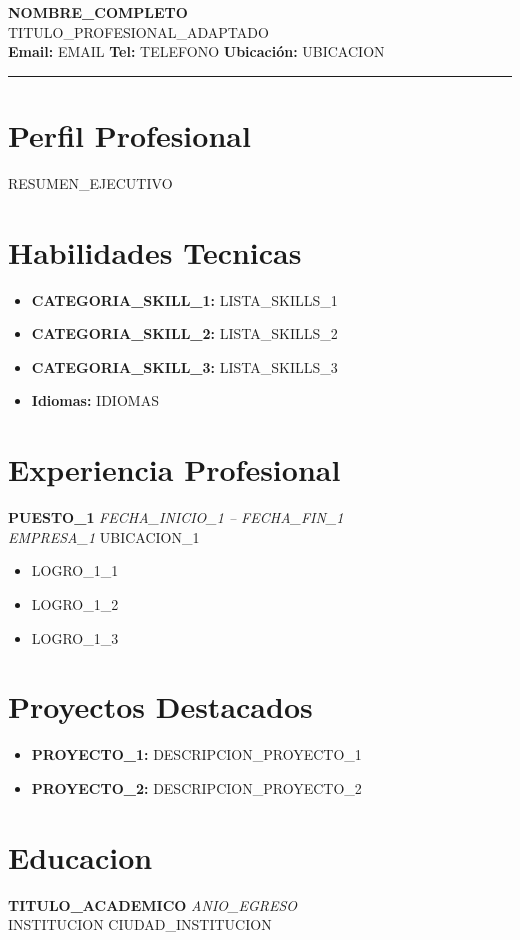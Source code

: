 \documentclass[11pt, a4paper]{article}
\begin{document}
{\LARGE\bfseries {{NOMBRE_COMPLETO}}}\\[2pt]
{\large {{TITULO_PROFESIONAL_ADAPTADO}}}\\[4pt]
\small
\textbf{Email:} {{EMAIL}} \quad
\textbf{Tel:} {{TELEFONO}} \quad
\textbf{Ubicaci\'on:} {{UBICACION}}

\vspace{6pt}\hrule\vspace{6pt}

\section{Perfil Profesional}
{{RESUMEN_EJECUTIVO}}

\section{Habilidades Tecnicas}
\begin{itemize}[leftmargin=*, itemsep=1pt]
    \item \textbf{{{CATEGORIA_SKILL_1}}:} {{LISTA_SKILLS_1}}
    \item \textbf{{{CATEGORIA_SKILL_2}}:} {{LISTA_SKILLS_2}}
    \item \textbf{{{CATEGORIA_SKILL_3}}:} {{LISTA_SKILLS_3}}
    \item \textbf{Idiomas:} {{IDIOMAS}}
\end{itemize}

\section{Experiencia Profesional}
\textbf{{{PUESTO_1}}} \hfill \textit{{{FECHA_INICIO_1}} -- {{FECHA_FIN_1}}}\\
\textit{{{EMPRESA_1}}} \hfill {{UBICACION_1}}
\begin{itemize}[leftmargin=*, itemsep=1pt]
    \item {{LOGRO_1_1}}
    \item {{LOGRO_1_2}}
    \item {{LOGRO_1_3}}
\end{itemize}

\section{Proyectos Destacados}
\begin{itemize}[leftmargin=*, itemsep=2pt]
    \item \textbf{{{PROYECTO_1}}:} {{DESCRIPCION_PROYECTO_1}}
    \item \textbf{{{PROYECTO_2}}:} {{DESCRIPCION_PROYECTO_2}}
\end{itemize}

\section{Educacion}
\textbf{{{TITULO_ACADEMICO}}} \hfill \textit{{{ANIO_EGRESO}}}\\
{{INSTITUCION}} \hfill {{CIUDAD_INSTITUCION}}
\end{document}
